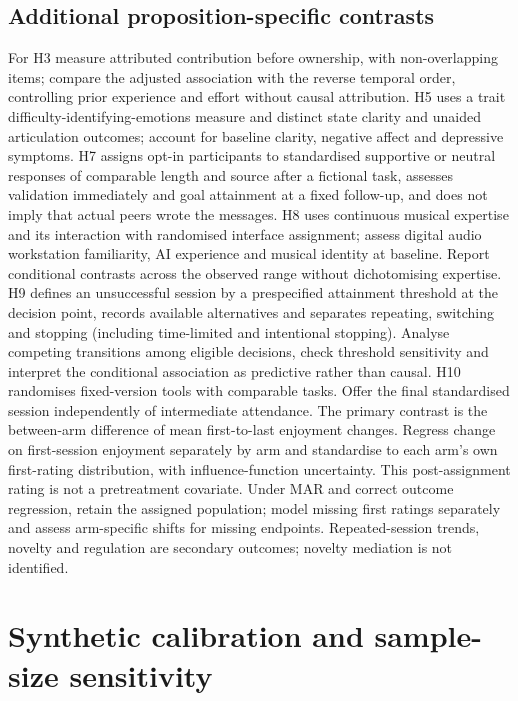 \documentclass[11pt,a4paper]{article}
\begin{document}
\subsection{Additional proposition-specific contrasts}
For H3 measure attributed contribution before ownership, with non-overlapping items; compare the adjusted association with the reverse temporal order, controlling prior experience and effort without causal attribution. H5 uses a trait difficulty-identifying-emotions measure and distinct state clarity and unaided articulation outcomes; account for baseline clarity, negative affect and depressive symptoms. H7 assigns opt-in participants to standardised supportive or neutral responses of comparable length and source after a fictional task, assesses validation immediately and goal attainment at a fixed follow-up, and does not imply that actual peers wrote the messages. H8 uses continuous musical expertise and its interaction with randomised interface assignment; assess digital audio workstation familiarity, AI experience and musical identity at baseline. Report conditional contrasts across the observed range without dichotomising expertise. H9 defines an unsuccessful session by a prespecified attainment threshold at the decision point, records available alternatives and separates repeating, switching and stopping (including time-limited and intentional stopping). Analyse competing transitions among eligible decisions, check threshold sensitivity and interpret the conditional association as predictive rather than causal. H10 randomises fixed-version tools with comparable tasks. Offer the final standardised session independently of intermediate attendance. The primary contrast is the between-arm difference of mean first-to-last enjoyment changes. Regress change on first-session enjoyment separately by arm and standardise to each arm's own first-rating distribution, with influence-function uncertainty. This post-assignment rating is not a pretreatment covariate. Under MAR and correct outcome regression, retain the assigned population; model missing first ratings separately and assess arm-specific shifts for missing endpoints. Repeated-session trends, novelty and regulation are secondary outcomes; novelty mediation is not identified.

\section{Synthetic calibration and sample-size sensitivity}

\printbibliography
\end{document}
